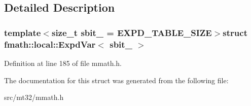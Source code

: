 \subsection{Detailed Description}
\subsubsection*{template$<$size\-\_\-t sbit\-\_\- = E\-X\-P\-D\-\_\-\-T\-A\-B\-L\-E\-\_\-\-S\-I\-Z\-E$>$struct fmath\-::local\-::\-Expd\-Var$<$ sbit\-\_\- $>$}



Definition at line 185 of file mmath.\-h.



The documentation for this struct was generated from the following file\-:\begin{DoxyCompactItemize}
\item 
src/mt32/mmath.\-h\end{DoxyCompactItemize}
